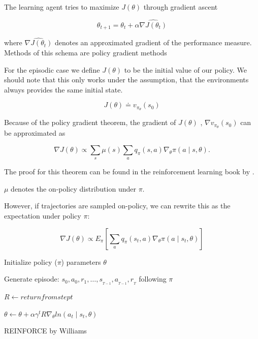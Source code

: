 The learning agent tries to maximize $J(\theta)$ through gradient ascent

\begin{equation}
\theta_{t+1} = \theta_t + \alpha \widehat{\nabla J(\theta_t)}
\end{equation}

where $\widehat{\nabla J(\theta_t)}$ denotes an approximated gradient of the performance measure.
Methods of this schema are policy gradient methods \citep{Sut98} 

For the episodic case we define $J(\theta)$ to be the initial value of our policy. We should note that this only works under the assumption, that the environments always provides the same initial state.

\begin{equation}
J(\theta) \doteq v_{\pi_\theta}(s_0)
\end{equation}

Because of the policy gradient theorem, the gradient of $J(\theta)$ , $ \nabla v_{\pi_\theta}(s_0)$ can be approximated as

\begin{equation}
\nabla J(\theta) \propto \sum_s \mu (s) \sum_a q_\pi (s,a) \nabla_\theta \pi(a \mid s, \theta).
\end{equation}

The proof for this theorem can be found in the reinforcement learning book by \citet{Sut98}.

$\mu$ denotes the on-policy distribution under $\pi$.

However, if trajectories are sampled on-policy, we can rewrite this as the expectation under policy $\pi$:

\begin{equation}
\nabla J(\theta) \propto E_\pi \left[ \sum_a q_\pi (s_t,a) \nabla_\theta \pi (a \mid s_t, \theta) \right]
\end{equation}


\begin{algorithm}[h]

 Initialize policy ($\pi$) parameters $\theta$ 
 
 { 
 Generate episode: $s_0, a_0, r_1, \dots,s_{_{T-1}},   a_{_{T-1}}, r_{_T}$ following $\pi$ 
 
 {
 $R \gets return from step t$
 
 $\theta \gets \theta + \alpha \gamma^t R\nabla_\theta ln(a_t \mid s_t, \theta)$
 }

 }

 \caption{REINFORCE by Williams \citep{Sut98}}
\end{algorithm}



